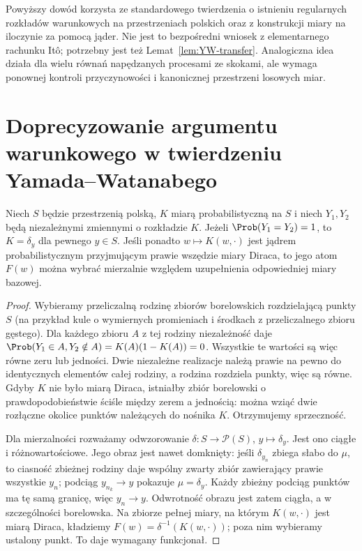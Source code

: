 \begin{uwaga}
Powyższy dowód korzysta ze standardowego twierdzenia o
istnieniu regularnych rozkładów warunkowych na przestrzeniach
polskich oraz z konstrukcji miary na iloczynie za pomocą jąder.
Nie jest to bezpośredni wniosek z elementarnego rachunku
Itô; potrzebny jest też Lemat~\ref{lem:YW-transfer}.
Analogiczna idea działa dla wielu równań napędzanych
procesami ze skokami, ale wymaga ponownej kontroli
przyczynowości i kanonicznej przestrzeni losowych miar.
\end{uwaga}


\section{Doprecyzowanie argumentu warunkowego w twierdzeniu Yamada--Watanabego}

\begin{lemat}
\label{lem:dirac-audit}
Niech $S$ będzie przestrzenią polską, $K$ miarą
probabilistyczną na $S$ i niech $Y_1,Y_2$ będą
niezależnymi zmiennymi o rozkładzie $K$. Jeżeli
$\Prob(Y_1=Y_2)=1$, to $K=\delta_y$ dla pewnego $y\in S$.
Jeśli ponadto $w\mapsto K(w,\cdot)$ jest jądrem
probabilistycznym przyjmującym prawie wszędzie miary
Diraca, to jego atom $F(w)$ można wybrać mierzalnie
względem uzupełnienia odpowiedniej miary bazowej.
\end{lemat}
\begin{proof}
Wybieramy przeliczalną rodzinę zbiorów borelowskich
rozdzielającą punkty $S$ (na przykład kule o wymiernych
promieniach i środkach z przeliczalnego zbioru gęstego).
Dla każdego zbioru $A$ z tej rodziny niezależność daje
$\Prob(Y_1\in A,Y_2\notin A)=K(A)(1-K(A))=0$.
Wszystkie te wartości są więc równe zeru lub jedności.
Dwie niezależne realizacje należą prawie na pewno do
identycznych elementów całej rodziny, a rodzina rozdziela
punkty, więc są równe. Gdyby $K$ nie było miarą Diraca,
istniałby zbiór borelowski o prawdopodobieństwie ściśle
między zerem a jednością: można wziąć dwie rozłączne
okolice punktów należących do nośnika $K$.
Otrzymujemy sprzeczność.

Dla mierzalności rozważamy odwzorowanie
$\delta:S\to\mathcal P(S)$, $y\mapsto\delta_y$.
Jest ono ciągłe i różnowartościowe. Jego obraz jest
nawet domknięty: jeśli $\delta_{y_n}$ zbiega słabo do
$\mu$, to ciasność zbieżnej rodziny daje wspólny
zwarty zbiór zawierający prawie wszystkie $y_n$;
podciąg $y_{n_k}\to y$ pokazuje $\mu=\delta_y$.
Każdy zbieżny podciąg punktów ma tę samą granicę,
więc $y_n\to y$. Odwrotność obrazu jest zatem
ciągła, a w szczególności borelowska. Na zbiorze pełnej miary, na którym
$K(w,\cdot)$ jest miarą Diraca, kładziemy
$F(w)=\delta^{-1}(K(w,\cdot))$; poza nim wybieramy
ustalony punkt. To daje wymagany funkcjonał.
\end{proof}

